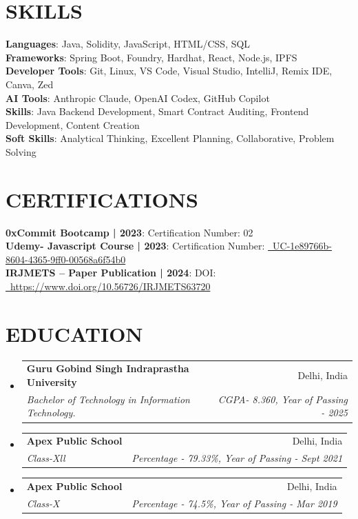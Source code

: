 \documentclass[letterpaper,11pt]{article}
\makeatletter
\newcommand{\resumeSubheading}[4]{
  \vspace{-2pt}\item
    \begin{tabular*}{0.97\textwidth}[t]{l@{\extracolsep{\fill}}r}
      \textbf{#1} & #2 \\
      \textit{\small#3} & \textit{\small #4} \\
    \end{tabular*}\vspace{-7pt}
}
\newcommand{\resumeSubHeadingListStart}{\begin{itemize}[leftmargin=0.15in, label={}]}
\newcommand{\resumeSubHeadingListEnd}{\end{itemize}}
\makeatother
\begin{document}
\section{\textbf{\MakeUppercase{Skills}}}
 \begin{itemize}[leftmargin=0.15in, label={}]
    \small{\item{
     \textbf{Languages}{: Java, Solidity, JavaScript, HTML/CSS, SQL} \\
     \textbf{Frameworks}{: Spring Boot, Foundry, Hardhat, React, Node.js, IPFS} \\
     \textbf{Developer Tools}{: Git, Linux, VS Code, Visual Studio, IntelliJ, Remix IDE, Canva, Zed} \\
     \textbf{AI Tools}{: Anthropic Claude, OpenAI Codex, GitHub Copilot} \\
     \textbf{Skills}{: Java Backend Development, Smart Contract Auditing, Frontend Development, Content Creation} \\
     \textbf{Soft Skills}{: Analytical Thinking, Excellent Planning, Collaborative, Problem Solving} \\
    }}
 \end{itemize}

\section{\textbf{\MakeUppercase{Certifications}}}
 \begin{itemize}[leftmargin=0.15in, label={}]
    \small{\item{
     \textbf{0xCommit Bootcamp | 2023}{: Certiﬁcation Number: 02} \\
     \textbf{Udemy- Javascript Course | 2023}{: Certiﬁcation Number: \href{https://ude.my/UC-1e89766b-8604-4365-9ff0-00568a6f54b0}{{\color{linkcolor}\faExternalLink}\ UC-1e89766b-8604-4365-9ff0-00568a6f54b0}} \\
     \textbf{IRJMETS -- Paper Publication | 2024}{: DOI: \href{https://www.doi.org/10.56726/IRJMETS63720}{{\color{linkcolor}\faExternalLink}\ https://www.doi.org/10.56726/IRJMETS63720}} \\
    }}
 \end{itemize}

\section{\textbf{\MakeUppercase{Education}}}
  \resumeSubHeadingListStart
    \resumeSubheading
      {Guru Gobind Singh Indraprastha University}{Delhi, India}
      {Bachelor of Technology in Information Technology.}{CGPA- 8.360, Year of Passing - 2025}
    \resumeSubheading
      {Apex Public School}{Delhi, India}
      {Class-Xll}{Percentage - 79.33\%, Year of Passing - Sept 2021}
    \resumeSubheading
      {Apex Public School}{Delhi, India}
      {Class-X}{Percentage - 74.5\%, Year of Passing - Mar 2019}
  \resumeSubHeadingListEnd
\end{document}
